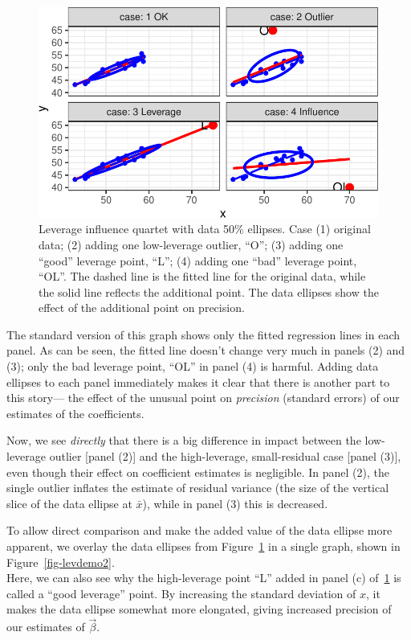 \documentclass[
  letterpaper,
  10pt,
  krantz2]{krantz}
\begin{document}
\begin{figure}[H]

{\centering \includegraphics[width=1\textwidth,height=\textheight]{figs/fig-levdemo-1.pdf}

}

\caption{\label{fig-levdemo}Leverage influence quartet with data 50\%
ellipses. Case (1) original data; (2) adding one low-leverage outlier,
``O''; (3) adding one ``good'' leverage point, ``L''; (4) adding one
``bad'' leverage point, ``OL''. The dashed line is the fitted line for
the original data, while the solid line reflects the additional point.
The data ellipses show the effect of the additional point on precision.}

\end{figure}

The standard version of this graph shows only the fitted regression
lines in each panel. As can be seen, the fitted line doesn't change very
much in panels (2) and (3); only the bad leverage point, ``OL'' in panel
(4) is harmful. Adding data ellipses to each panel immediately makes it
clear that there is another part to this story--- the effect of the
unusual point on \emph{precision} (standard errors) of our estimates of
the coefficients.

Now, we see \emph{directly} that there is a big difference in impact
between the low-leverage outlier {[}panel (2){]} and the high-leverage,
small-residual case {[}panel (3){]}, even though their effect on
coefficient estimates is negligible. In panel (2), the single outlier
inflates the estimate of residual variance (the size of the vertical
slice of the data ellipse at \(\bar{x}\)), while in panel (3) this is
decreased.

To allow direct comparison and make the added value of the data ellipse
more apparent, we overlay the data ellipses from
Figure~\ref{fig-levdemo} in a single graph, shown in
Figure~\ref{fig-levdemo2}.\\
Here, we can also see why the high-leverage point ``L'' added in panel
(c) of~\ref{fig-levdemo} is called a ``good leverage'' point. By
increasing the standard deviation of \(x\), it makes the data ellipse
somewhat more elongated, giving increased precision of our estimates of
\(\vec{\beta}\).
\end{document}
